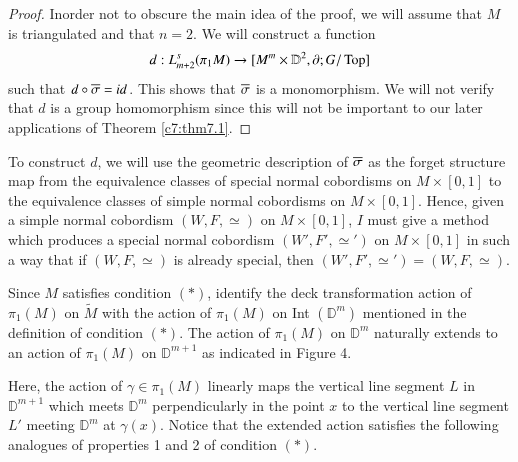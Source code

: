 \begin{proof}
  In\pageoriginale order not to obscure the main idea of the proof, we
  will assume that $M$ is triangulated and that $n=2$. We will
  construct a function
  $$
  d: L_{m+2}^s (\pi_1 M)\to [M^m \times \mathbb{D}^2, \partial; G/\operatorname{Top}]
  $$
  such that $d \circ \overline{\sigma} = id$. This shows that $\overline{\sigma}$
    is a monomorphism. We will not verify that $d$ is a group
    homomorphism since this will not be important to our later
    applications of Theorem \ref{c7:thm7.1}.
\end{proof}

To construct $d$, we will use the geometric description of
$\overline{\sigma}$ as the forget structure map from the equivalence classes
of special normal cobordisms on $M \times [0,1]$ to the equivalence
classes of simple normal cobordisms on $M \times [0, 1]$. Hence, given
a simple normal cobordism $(W, F, \simeq)$ on $M \times [0,1]$, $I$ must
give a method which produces a special normal cobordism $(W', F',
\simeq')$ on $M \times [0, 1]$ in such a way that if $(W, F, \simeq)$
is already special, then $(W', F', \simeq')= (W, F, \simeq)$.

Since $M$ satisfies condition $(*)$, identify the deck transformation
action of $\pi_1 (M)$ on $\tilde{M}$ with the action of $\pi_1(M)$ on
Int $(\mathbb{D}^m)$ mentioned in the definition of condition
$(*)$. The action of $\pi_1 (M)$ on $\mathbb{D}^m$ naturally extends
to an action of $\pi_1 (M)$ on $\mathbb{D}^{m+1}$ as indicated in
Figure 4.

\begin{figure}[H]
\end{figure}

Here, the action of $\gamma \in \pi_1(M)$ linearly maps the vertical
line segment $L$ in $\mathbb{D}^{m+1}$ which meets $\mathbb{D}^m$
perpendicularly in the point $x$ to the vertical line segment $L'$
meeting $\mathbb{D}^m$ at $\gamma (x)$. Notice that the extended
action satisfies the following analogues of properties 1 and 2 of
condition $(*)$.

